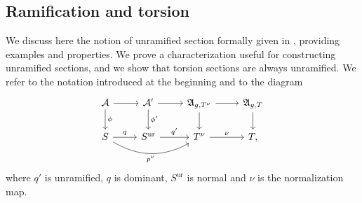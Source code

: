 \documentclass[10 pt,a4paper]{article}
\theoremstyle{plain}
\theoremstyle{definition}
\newtheorem{rem}[thm]{Remark}
\theoremstyle{named}
\DeclareMathOperator{\ur}{ur}
\newcommand{\cA}{\mathcal A}
\newcommand{\fA}{\mathfrak A}
\newcommand{\bC}{\mathbb C}
\begin{document}







\subsection{Ramification and torsion}\label{sec:tor_ram}

We discuss here the notion of unramified section formally given in , providing examples and properties. We prove a characterization useful for constructing unramified sections, and we show that torsion sections are always unramified. We refer to the notation introduced at the beginning and to the diagram 
\begin{equation}\label{eq:relNormalization}
	\begin{tikzcd}
		\cA \arrow{d}{\phi} \arrow{r} & \cA' \arrow{d}{\phi'}\arrow{r} & \fA_{g,T^\nu} \arrow{d}\arrow{r} & \fA_{g,T}\arrow{d}\\
		S \arrow{r}{q} \arrow[bend right, swap]{rr}{p^\nu}& S^{\ur} \arrow{r}{q'} & T^\nu \arrow{r}{\nu} & T,
	\end{tikzcd}
\end{equation}
where $q'$ is unramified, $q$ is dominant, $S^{\ur}$ is normal and $\nu$ is the normalization map.
\end{document}
